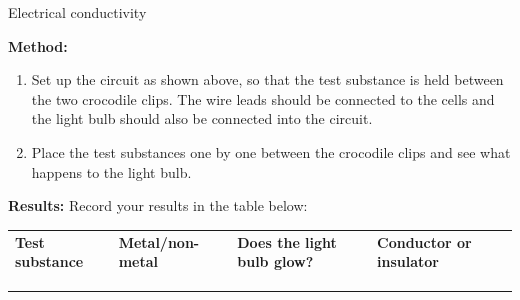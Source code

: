 \begin{iexperiment}{Electrical conductivity}
{      \label{m38706*id66251}\noindent{}\textbf{Method:}
        \newline
      \label{m38706*id66260}\begin{enumerate}[noitemsep, label=\textbf{\arabic*}. ] 
            \label{m38706*uid100}\item Set up the circuit as shown above, so that the test substance is held between the two crocodile clips. The wire leads should be connected to the cells and the light bulb should also be connected into the circuit.
\label{m38706*uid101}\item Place the test substances one by one between the crocodile clips and see what happens to the light bulb.
\end{enumerate}
        \par 
      \label{m38706*id66291}\noindent{}\textbf{Results:}
        \newline
      Record your results in the table below:
          \begin{table}[H]
        \begin{center}
      \label{m38706*id66304}
    \noindent
      \tablelasttail{}
      \begin{xtabular}[t]{|l|l|l|l|}\hline
                \textbf{Test substance}
               &
                \textbf{Metal/non-metal}
               &
                \textbf{Does the light bulb glow?}
               &
                \textbf{Conductor or insulator}
     \tabularnewline{}
         &
         &
         &
     \tabularnewline{}
         &
         &
         &
     \tabularnewline{}
         &
         &
         &
     \tabularnewline{}

\end{xtabular}
\end{center}
\end{table}}
\end{iexperiment}
